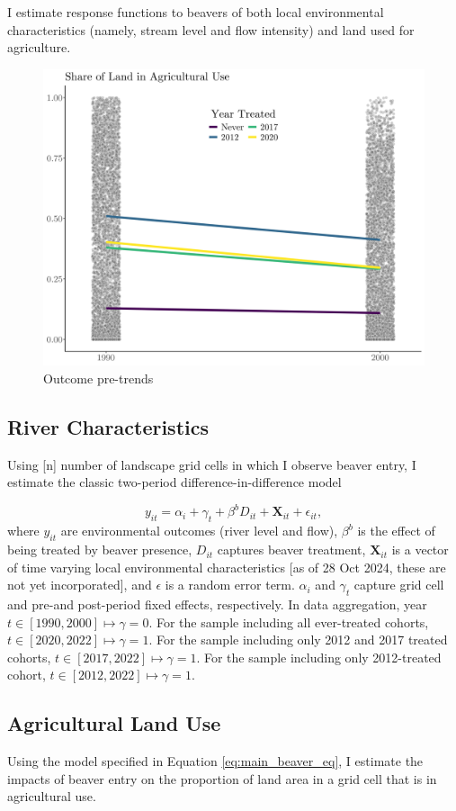 I estimate response functions to beavers of both local environmental characteristics (namely, stream level and flow intensity) and land used for agriculture.

\begin{figure}
    \centering
    \includegraphics[width=0.7\linewidth]{output/figures/outcome_pretrends.png}
    \caption{Outcome pre-trends}
    \label{fig:outcome-pretrends}
\end{figure}

\subsection{River Characteristics}

Using [n] number of landscape grid cells in which I observe beaver entry, I estimate the classic two-period difference-in-difference model

\begin{equation} \label{eq:main_beaver_eq}
y_{it} = \alpha_i + \gamma_t + \beta^{b}D_{it} + \mathbf{X}_{it} + \epsilon_{it},
\end{equation}
where $y_{it}$ are environmental outcomes (river level and flow), $\beta^b$ is the effect of being treated by beaver presence, $D_{it}$ captures beaver treatment, $\mathbf{X}_{it}$ is a vector of time varying local environmental characteristics [as of 28 Oct 2024, these are not yet incorporated], and $\epsilon$ is a random error term. $\alpha_i$ and $\gamma_t$ capture grid cell and pre-and post-period fixed effects, respectively. In data aggregation, year $t \in [1990, 2000] \mapsto \gamma = 0$. For the sample including all ever-treated cohorts, $t \in [2020, 2022] \mapsto \gamma = 1$. For the sample including only 2012 and 2017 treated cohorts, $t \in [2017, 2022] \mapsto \gamma = 1$. For the sample including only 2012-treated cohort, $t \in [2012, 2022] \mapsto \gamma = 1$.



\subsection{Agricultural Land Use}

Using the model specified in Equation \eqref{eq:main_beaver_eq}, I estimate the impacts of beaver entry on the proportion of land area in a grid cell that is in agricultural use. 
